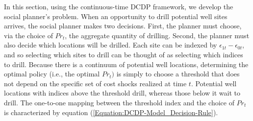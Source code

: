 In this section, using the continuous-time DCDP framework, we develop the social planner's problem. When an opportunity to drill potential well sites arrives, the social planner makes two decisions. First, the planner must choose, via the choice of $Pr_{t}$, the aggregate quantity of drilling. Second, the planner must also decide which locations will be drilled. Each site can be indexed by $\epsilon_{1t} - \epsilon_{0t}$, and so selecting which sites to drill can be thought of as selecting which indices to drill. Because there is a continuum of potential well locations, determining the optimal policy (i.e., the optimal $Pr_{t})$ is simply to choose a threshold that does not depend on the specific set of cost shocks realized at time $t$. Potential well locations with indices above the threshold drill, whereas those below it wait to drill. The one-to-one mapping between the threshold index and the choice of $Pr_{t}$ is characterized by equation (\ref{Equation:DCDP-Model_Decision-Rule}).

